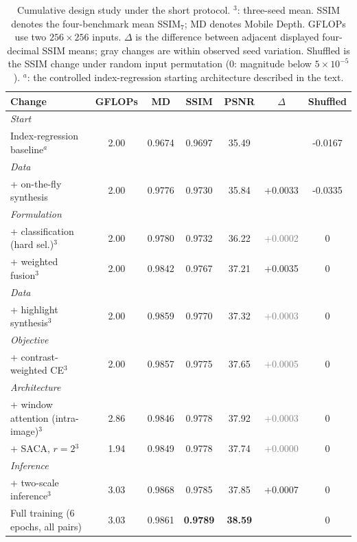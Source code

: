 \begin{table}[htbp]
\centering
\scriptsize
\setlength{\tabcolsep}{3pt}
\caption{Cumulative design study under the short protocol. $^3$: three-seed mean. SSIM denotes the four-benchmark mean SSIM$_7$; MD denotes Mobile Depth. GFLOPs use two $256\times256$ inputs. $\Delta$ is the difference between adjacent displayed four-decimal SSIM means; gray changes are within observed seed variation. Shuffled is the SSIM change under random input permutation ($0$: magnitude below $5\times10^{-5}$). $^a$: the controlled index-regression starting architecture described in the text.}
\label{tab:roadmap}
\begin{tabular}{lcccccc}
\toprule
Change & GFLOPs & MD & SSIM & PSNR & $\Delta$ & Shuffled \\
\midrule
\multicolumn{7}{l}{\textit{Start}} \\
Index-regression baseline$^{a}$ & 2.00 & 0.9674 & 0.9697 & 35.49 &  & -0.0167 \\
\multicolumn{7}{l}{\textit{Data}} \\
+ on-the-fly synthesis & 2.00 & 0.9776 & 0.9730 & 35.84 & +0.0033 & -0.0335 \\
\multicolumn{7}{l}{\textit{Formulation}} \\
+ classification (hard sel.)$^{3}$ & 2.00 & 0.9780 & 0.9732 & 36.22 & \textcolor{gray}{+0.0002} & $0$ \\
+ weighted fusion$^{3}$ & 2.00 & 0.9842 & 0.9767 & 37.21 & +0.0035 & $0$ \\
\multicolumn{7}{l}{\textit{Data}} \\
+ highlight synthesis$^{3}$ & 2.00 & 0.9859 & 0.9770 & 37.32 & \textcolor{gray}{+0.0003} & $0$ \\
\multicolumn{7}{l}{\textit{Objective}} \\
+ contrast-weighted CE$^{3}$ & 2.00 & 0.9857 & 0.9775 & 37.65 & \textcolor{gray}{+0.0005} & $0$ \\
\multicolumn{7}{l}{\textit{Architecture}} \\
+ window attention (intra-image)$^{3}$ & 2.86 & 0.9846 & 0.9778 & 37.92 & \textcolor{gray}{+0.0003} & $0$ \\
+ SACA, $r=2$$^{3}$ & 1.94 & 0.9849 & 0.9778 & 37.74 & \textcolor{gray}{+0.0000} & $0$ \\
\multicolumn{7}{l}{\textit{Inference}} \\
+ two-scale inference$^{3}$ & 3.03 & 0.9868 & 0.9785 & 37.85 & +0.0007 & $0$ \\
\midrule
Full training (6 epochs, all pairs) & 3.03 & 0.9861 & \textbf{0.9789} & \textbf{38.59} & & $0$ \\
\bottomrule
\end{tabular}
\end{table}
